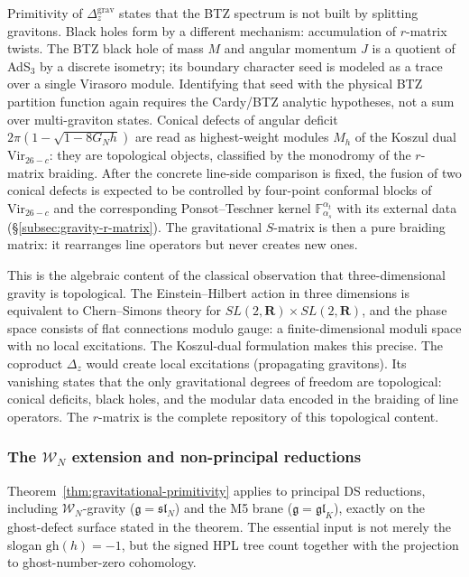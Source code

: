 Primitivity of $\Delta_z^{\mathrm{grav}}$ states that the BTZ
spectrum is not built by splitting gravitons. Black holes
form by a different mechanism: accumulation of $r$-matrix
twists. The BTZ black hole of mass $M$ and angular
momentum $J$ is a quotient of AdS$_3$ by a discrete isometry;
its boundary character seed is modeled as a trace over a single
Virasoro module. Identifying that seed with the physical BTZ
partition function again requires the Cardy/BTZ analytic hypotheses,
not a sum over multi-graviton states.
Conical defects of angular deficit $2\pi(1 - \sqrt{1 - 8G_Nh})$
are read as highest-weight modules $M_h$ of the Koszul dual
$\mathrm{Vir}_{26-c}$: they are topological objects, classified by the
monodromy of the $r$-matrix braiding. After the concrete line-side
comparison is fixed, the fusion of two conical defects is expected to
be controlled by four-point conformal blocks of
$\mathrm{Vir}_{26-c}$ and the corresponding Ponsot--Teschner kernel
$\mathbb{F}_{\alpha_s}^{\alpha_t}$ with its external data
(\S\ref{subsec:gravity-r-matrix}). The gravitational $S$-matrix is then
a pure braiding matrix:
it rearranges line operators but never creates new ones.

This is the algebraic content of the classical observation that
three-dimensional gravity is topological. The Einstein--Hilbert
action in three dimensions is equivalent to Chern--Simons theory
for $SL(2,\mathbf{R}) \times SL(2,\mathbf{R})$, and the phase
space consists of flat connections modulo gauge: a
finite-dimensional moduli space with no local excitations. The
Koszul-dual formulation makes this precise. The coproduct
$\Delta_z$ would create local excitations
(propagating gravitons). Its vanishing states that the only
gravitational degrees of freedom are topological:
conical deficits, black holes, and
the modular data encoded in the braiding of line operators.
The $r$-matrix is the complete repository of this
topological content.

\subsubsection*{The $\mathcal{W}_N$ extension and
 non-principal reductions}
\label{par:wn-ghost-obstruction}

Theorem~\ref{thm:gravitational-primitivity} applies to principal DS
reductions, including $\mathcal{W}_N$-gravity
($\mathfrak{g} = \mathfrak{sl}_N$) and the M5 brane
($\mathfrak{g} = \mathfrak{gl}_K$), exactly on the ghost-defect
surface stated in the theorem. The essential input is not merely the
slogan \(\mathrm{gh}(h)=-1\), but the signed HPL tree count together
with the projection to ghost-number-zero cohomology.

